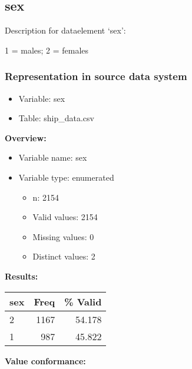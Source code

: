 \documentclass[
]{article}
\providecommand{\tightlist}{%
  \setlength{\itemsep}{0pt}\setlength{\parskip}{0pt}}
\begin{document}
\newpage

\hypertarget{sex}{%
\subsection{sex}\label{sex}}

Description for dataelement `sex':

1 = males; 2 = females

\hypertarget{representation-in-source-data-system-24}{%
\subsubsection{\texorpdfstring{Representation in \textbf{source} data
system}{Representation in source data system}}\label{representation-in-source-data-system-24}}

\begin{itemize}
\tightlist
\item
  Variable: sex
\item
  Table: ship\_data.csv
\end{itemize}

\textbf{Overview:}

\begin{itemize}
\tightlist
\item
  Variable name: sex
\item
  Variable type: enumerated

  \begin{itemize}
  \tightlist
  \item
    n: 2154
  \item
    Valid values: 2154
  \item
    Missing values: 0
  \item
    Distinct values: 2
  \end{itemize}
\end{itemize}

\textbf{Results:}\\

\begin{table}[H]
\centering
\begin{tabular}{l|r|r}
\hline
\textbf{sex} & \textbf{Freq} & \textbf{\% Valid}\\
\hline
2 & 1167 & 54.178\\
\hline
1 & 987 & 45.822\\
\hline
\end{tabular}
\end{table}

\textbf{Value conformance:}
\end{document}
